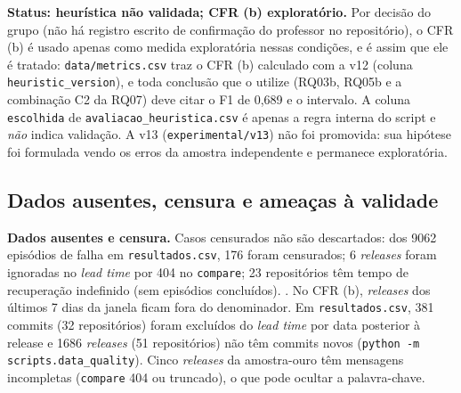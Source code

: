 \textbf{Status: heurística não validada; CFR (b) exploratório.} Por decisão do grupo (não há registro escrito de confirmação do professor no repositório), o CFR (b) é
usado apenas como medida exploratória nessas condições, e é assim que ele é tratado: \texttt{data/metrics.csv} traz
o CFR (b) calculado com a v12 (coluna \texttt{heuristic\_version}), e toda conclusão que o utilize
(RQ03b, RQ05b e a combinação C2 da RQ07) deve citar o F1 de 0,689 e o intervalo. A coluna \texttt{escolhida}
de \texttt{avaliacao\_heuristica.csv} é apenas a regra interna do script e \emph{não} indica validação. A
v13 (\texttt{experimental/v13}) não foi promovida: sua hipótese foi formulada vendo os erros da amostra
independente e permanece exploratória.

\subsection{Dados ausentes, censura e ameaças à validade}
\textbf{Dados ausentes e censura.} Casos censurados não são descartados: dos 9062 episódios de falha
em \texttt{resultados.csv}, 176 foram censurados; 6 \textit{releases} foram ignoradas no \textit{lead
time} por 404 no \texttt{compare}; 23 repositórios têm tempo de recuperação indefinido (sem episódios
concluídos). . No CFR (b), \textit{releases} dos últimos 7 dias da janela ficam fora do
denominador. Em \texttt{resultados.csv}, 381 commits (32 repositórios) foram excluídos do \textit{lead time} por data posterior à release e 1686 \textit{releases} (51 repositórios) não têm commits novos (\texttt{python -m scripts.data\_quality}). Cinco \textit{releases} da amostra-ouro têm mensagens incompletas (\texttt{compare} 404 ou
truncado), o que pode ocultar a palavra-chave.

